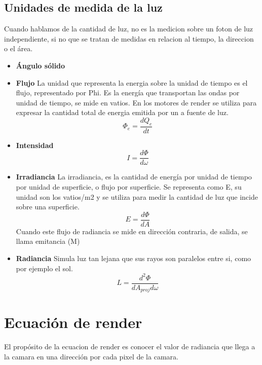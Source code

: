     \subsection{Unidades de medida de la luz}
        Cuando hablamos de la cantidad de luz, no es la medicion sobre un foton de luz independiente, si no que se tratan de medidas en relacion
        al tiempo, la direccion o el \'area.

        \begin{itemize}
        \item[] \textbf {{\'Angulo s\'olido}}
        \item[] \textbf {Flujo} La unidad que representa la energia sobre la unidad de tiempo es el flujo, representado por Phi. Es la energía que transportan las ondas
        por unidad de tiempo, se mide en vatios. En los motores de render se utiliza para expresar la cantidad total de energia emitida por un a fuente de luz.
        \begin{equation}
            \Phi_e = \dfrac{d{Q_e}}{dt}
        \end{equation}
        \item[] \textbf {Intensidad}
        \begin{equation}
            I = \dfrac{d\Phi}{d\omega}
        \end{equation} 
        \item[] \textbf {Irradiancia} La irradiancia, es la cantidad de energ\'ia por unidad de tiempo por unidad de superficie, o flujo por superficie. Se representa como
        E, su unidad son los vatios/m2 y se utiliza para medir la cantidad de luz que incide sobre una superficie.
        \begin{equation}
            E = \dfrac{d\Phi}{dA}
        \end{equation}
        Cuando este flujo de radiancia se mide en direcci\'on contraria, de salida, se llama emitancia (M)
        \item[] \textbf {Radiancia} Simula luz tan lejana que sus rayos son paralelos entre si, como por ejemplo el sol.
        \begin{equation}
            L = \dfrac{d^2\Phi}{dA_{proj}d\omega}
        \end{equation}
        \end{itemize}

\section{Ecuaci\'on de render}
    El prop\'osito de la ecuacion de render es conocer el valor de radiancia que llega a la camara en una direcci\'on
    por cada pixel  de la camara.

